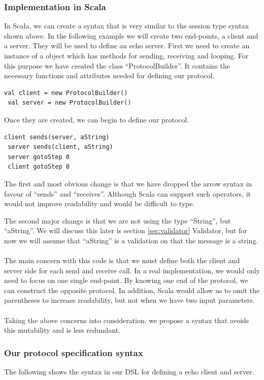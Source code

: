 \subsubsection{Implementation in Scala}
In Scala, we can create a syntax that is very similar to the session type syntax shown above. In the following example we will create two end-points, a client and a server. They will be used to define an echo server. First we need to create an instance of a object which has methods for sending, receiving and looping. For this purpose we have created the class ``ProtocolBuilder''. It contains the necessary functions and attributes needed for defining our protocol.
\begin{lstlisting}[style=myScalastyle]
 val client = new ProtocolBuilder()
 val server = new ProtocolBuilder()
\end{lstlisting}
Once they are created, we can begin to define our protocol.
\begin{lstlisting}[style=myScalastyle]
 client sends(server, aString)
 server sends(client, aString)
 server gotoStep 0
 client gotoStep 0 
\end{lstlisting}
The first and most obvious change is that we have dropped the arrow syntax in favour of ``sends'' and ``receives''. Although Scala can support such operators, it would not improve readability and would be difficult to type.

The second major change is that we are not using the type ``String'', but ``aString''. We will discuss this later is section {\ref{sec:validator} Validator}, but for now we will assume that ``aString'' is a validation on that the message is a string.   
\\\\
The main concern with this code is that we must define both the client and server side for each send and receive call. In a real implementation, we would only need to focus on one single end-point. By knowing one end of the protocol, we can construct the opposite protocol. In addition, Scala would allow us to omit the parentheses to increase readability, but not when we have two input parameters.
\\\\
Taking the above concerns into consideration, we propose a syntax that avoids this mutability and is less redundant. 

\subsubsection{Our protocol specification syntax}
The following shows the syntax in our DSL for defining a echo client and server.

